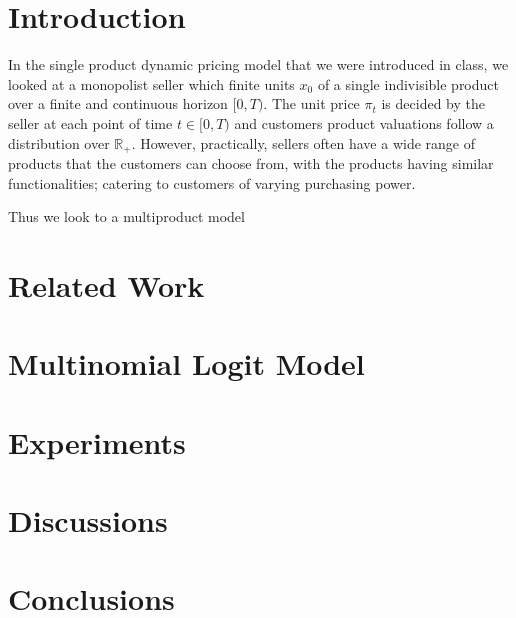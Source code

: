 


\section{Introduction}

In the single product dynamic pricing model that we were introduced in class, we looked at a monopolist seller which finite units $x_0$ of a single indivisible product over a finite and continuous horizon $[0,T)$. The unit price $\pi_t$ is decided by the seller at each point of time $t \in [0,T)$ and customers product valuations follow a distribution over $\mathbb{R}_+$. However, practically, sellers often have a wide range of products that the customers can choose from, with the products having similar functionalities; catering to customers of varying purchasing power.

Thus we look to a multiproduct model \cite{Li2009}





\section{Related Work}


\section{Multinomial Logit Model}


\section{Experiments}


\section{Discussions}


\section{Conclusions}





